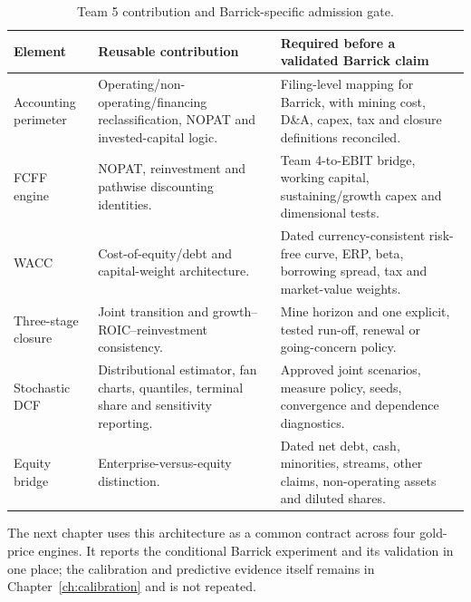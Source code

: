 \begin{table}[H]
\centering
\caption{Team 5 contribution and Barrick-specific admission gate.}
\label{tab:dcf-reuse-gates}
\small
\renewcommand{\arraystretch}{1.12}
\begin{tabularx}{\textwidth}{@{}p{2.7cm}X X@{}}
\toprule
Element & Reusable contribution & Required before a validated Barrick claim \\
\midrule
Accounting perimeter & Operating/non-operating/financing reclassification,
NOPAT and invested-capital logic. & Filing-level mapping for Barrick, with
mining cost, D\&A, capex, tax and closure definitions reconciled. \\
FCFF engine & NOPAT, reinvestment and pathwise discounting identities. & Team
4-to-EBIT bridge, working capital, sustaining/growth capex and dimensional
tests. \\
WACC & Cost-of-equity/debt and capital-weight architecture. & Dated currency-consistent
risk-free curve, ERP, beta, borrowing spread, tax and market-value
weights. \\
Three-stage closure & Joint transition and growth--ROIC--reinvestment
consistency. & Mine horizon and one explicit, tested run-off, renewal or going-concern
policy. \\
Stochastic DCF & Distributional estimator, fan charts, quantiles, terminal
share and sensitivity reporting. & Approved joint scenarios, measure policy,
seeds, convergence and dependence diagnostics. \\
Equity bridge & Enterprise-versus-equity distinction. & Dated net debt, cash,
minorities, streams, other claims, non-operating assets and diluted shares. \\
\bottomrule
\end{tabularx}
\end{table}

The next chapter uses this architecture as a common contract across four gold-price
engines. It reports the conditional Barrick experiment and its validation
in one place; the calibration and predictive evidence itself remains in
Chapter~\ref{ch:calibration} and is not repeated.
